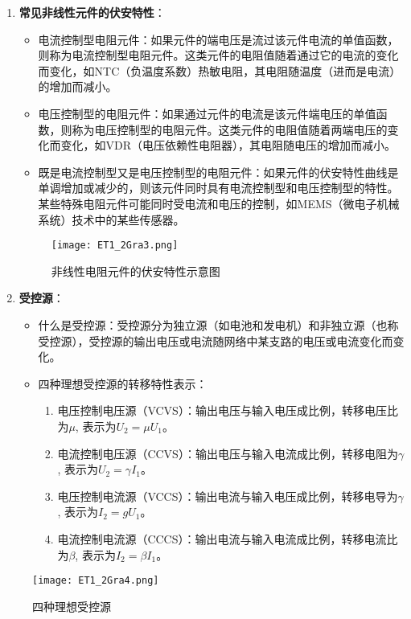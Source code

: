 \documentclass[dvipsnames, svgnames,a4paper,11pt]{article}
\begin{document}
\begin{enumerate}
		\item \textbf{常见非线性元件的伏安特性}：
		\begin{itemize}
			\item 电流控制型电阻元件：如果元件的端电压是流过该元件电流的单值函数，则称为电流控制型电阻元件。这类元件的电阻值随着通过它的电流的变化而变化，如NTC（负温度系数）热敏电阻，其电阻随温度（进而是电流）的增加而减小。
			\item 电压控制型的电阻元件：如果通过元件的电流是该元件端电压的单值函数，则称为电压控制型的电阻元件。这类元件的电阻值随着两端电压的变化而变化，如VDR（电压依赖性电阻器），其电阻随电压的增加而减小。
			\item 既是电流控制型又是电压控制型的电阻元件：如果元件的伏安特性曲线是单调增加或减少的，则该元件同时具有电流控制型和电压控制型的特性。某些特殊电阻元件可能同时受电流和电压的控制，如MEMS（微电子机械系统）技术中的某些传感器。
		\end{itemize}
		
		\begin{figure}[htbp]
			\centering
			\texttt{[image: ET1\_2Gra3.png]}
			\caption{非线性电阻元件的伏安特性示意图}
			\label{fig:fig3}
		\end{figure}
		
		\item \textbf{受控源}：
		\begin{itemize}
			\item 什么是受控源：受控源分为独立源（如电池和发电机）和非独立源（也称受控源），受控源的输出电压或电流随网络中某支路的电压或电流变化而变化。
			\item 四种理想受控源的转移特性表示：
			\begin{enumerate}
				\item 电压控制电压源（VCVS）：输出电压与输入电压成比例，转移电压比为\(\mu\), 表示为$U_2 = \mu U_1$。
				\item 电流控制电压源（CCVS）：输出电压与输入电流成比例，转移电阻为\(\gamma\), 表示为$U_2 = \gamma I_1$。
				\item 电压控制电流源（VCCS）：输出电流与输入电压成比例，转移电导为\(\gamma\), 表示为$I_2 = gU_1$。
				\item 电流控制电流源（CCCS）：输出电流与输入电流成比例，转移电流比为\(\beta\), 表示为$I_2 = \beta I_1$。
			\end{enumerate}
		\end{itemize}
	\end{enumerate}

		\begin{figure}[htbp]
			\centering
			\texttt{[image: ET1\_2Gra4.png]}
			\caption{四种理想受控源}
			\label{fig:fig4}
		\end{figure}
\end{document}
